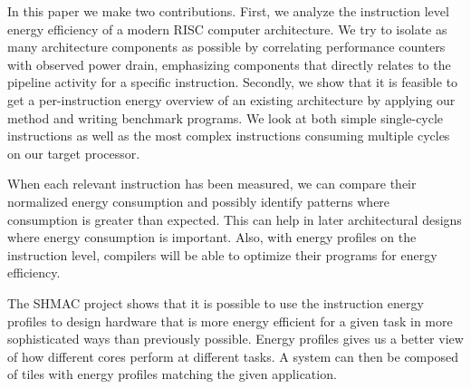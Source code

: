 In this paper we make two contributions. First, we analyze the instruction level
energy efficiency of a modern RISC computer architecture. We try to isolate as
many architecture components as possible by correlating performance counters
with observed power drain, emphasizing components that directly relates to the
pipeline activity for a specific instruction. Secondly, we show that it is
feasible to get a per-instruction energy overview of an existing architecture by
applying our method and writing benchmark programs. We look at both simple
single-cycle instructions as well as the most complex instructions consuming
multiple cycles on our target processor.

When each relevant instruction has been measured, we can compare their
normalized energy consumption and possibly identify patterns where consumption
is greater than expected. This can help in later architectural designs where
energy consumption is important. Also, with energy profiles on the instruction
level, compilers will be able to optimize their programs for energy efficiency.

The SHMAC project shows that it is possible to use the instruction energy
profiles to design hardware that is more energy efficient for a given task in
more sophisticated ways than previously possible. Energy profiles gives us a
better view of how different cores perform at different tasks. A system can then
be composed of tiles with energy profiles matching the given application.



